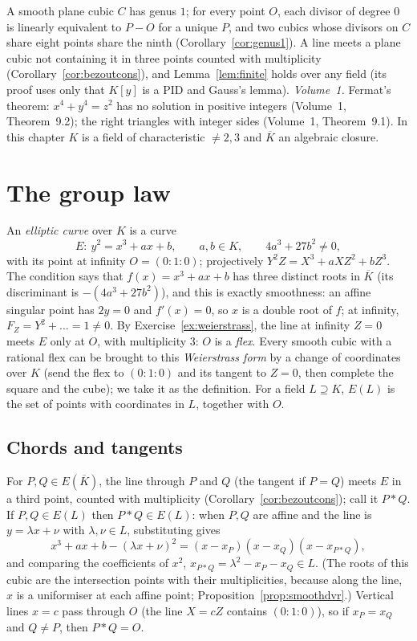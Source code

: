 \begin{reminder}
A smooth plane cubic $C$ has genus $1$; for every point $O$, each divisor of degree $0$ is linearly equivalent to $P-O$ for a unique $P$, and two cubics
whose divisors on $C$ share eight points share the ninth (Corollary~\ref{cor:genus1}). A line meets a plane cubic not containing it in three points
counted with multiplicity (Corollary~\ref{cor:bezoutcons}), and Lemma~\ref{lem:finite} holds over any field (its proof uses only that $K[y]$ is a
PID and Gauss's lemma). \emph{Volume~1.} Fermat's theorem: $x^4+y^4=z^2$ has no solution in positive integers (Volume~1, Theorem~9.2); the right triangles
with integer sides (Volume~1, Theorem~9.1). In this chapter $K$ is a field of characteristic $\ne2,3$ and $\overline K$ an algebraic closure.
\end{reminder}

\section{The group law}

An \emph{elliptic curve} over $K$ is a curve
\[
E:\ y^2=x^3+ax+b,\qquad a,b\in K,\qquad 4a^3+27b^2\ne0,
\]
with its point at infinity $O=(0:1:0)$; projectively $Y^2Z=X^3+aXZ^2+bZ^3$. The condition says that $f(x)=x^3+ax+b$ has three distinct roots in
$\overline K$ (its discriminant is $-(4a^3+27b^2)$), and this is exactly smoothness: an affine singular point has $2y=0$ and $f'(x)=0$, so $x$ is a double
root of $f$; at infinity, $F_Z=Y^2+\dots=1\ne0$. By Exercise~\ref{ex:weierstrass}, the line at infinity $Z=0$ meets $E$ only at $O$, with multiplicity
$3$: $O$ is a \emph{flex}. Every smooth cubic with a rational flex can be brought to this \emph{Weierstrass form} by a change of coordinates over $K$
(send the flex to $(0:1:0)$ and its tangent to $Z=0$, then complete the square and the cube); we take it as the definition. For a field $L\supseteq K$,
$E(L)$ is the set of points with coordinates in $L$, together with $O$.

\subsection*{Chords and tangents}

For $P,Q\in E(\overline K)$, the line through $P$ and $Q$ (the tangent if $P=Q$) meets $E$ in a third point, counted with multiplicity
(Corollary~\ref{cor:bezoutcons}); call it $P*Q$. If $P,Q\in E(L)$ then $P*Q\in E(L)$: when $P,Q$ are affine and the line is $y=\lambda x+\nu$ with
$\lambda,\nu\in L$, substituting gives
\[
x^3+ax+b-(\lambda x+\nu)^2=(x-x_P)(x-x_Q)(x-x_{P*Q}),
\]
and comparing the coefficients of $x^2$, $x_{P*Q}=\lambda^2-x_P-x_Q\in L$. (The roots of this cubic are the intersection points with their
multiplicities, because along the line, $x$ is a uniformiser at each affine point; Proposition~\ref{prop:smoothdvr}.) Vertical lines $x=c$ pass through $O$
(the line $X=cZ$ contains $(0:1:0)$), so if $x_P=x_Q$ and $Q\ne P$, then $P*Q=O$.

